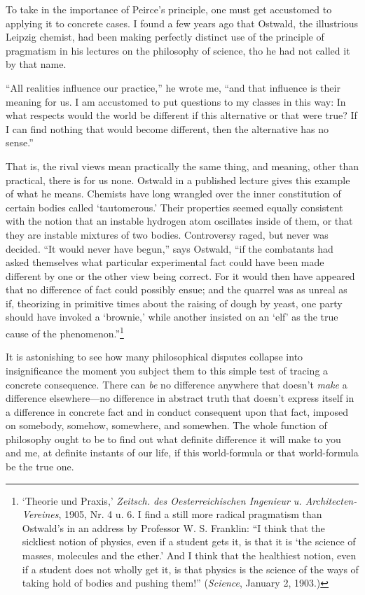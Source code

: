 To take in the importance of Peirce's principle, one must get
accustomed to applying it to concrete cases. I found a few years ago
that Ostwald, the illustrious Leipzig chemist, had been making
perfectly distinct use of the principle of pragmatism in his lectures
on the philosophy of science, tho he had not called it by that name.

``All realities influence our practice,'' he wrote me, ``and that
influence is their meaning for us. I am accustomed to put questions to
my classes in this way: In what respects would the world be different
if this alternative or that were true? If I can find nothing that
would become different, then the alternative has no sense.''

That is, the rival views mean practically the same thing, and meaning,
other than practical, there is for us none. Ostwald in a published
lecture gives this example of what he means. Chemists have long
wrangled over the inner constitution of certain bodies called
`tautomerous.' Their properties seemed equally consistent with the
notion that an instable hydrogen  atom oscillates inside of
them, or that they are instable mixtures of two bodies. Controversy
raged, but never was decided. ``It would never have begun,'' says
Ostwald, ``if the combatants had asked themselves what particular
experimental fact could have been made different by one or the other
view being correct. For it would then have appeared that no difference
of fact could possibly ensue; and the quarrel was as unreal as if,
theorizing in primitive times about the raising of dough by yeast, one
party should have invoked a `brownie,' while another insisted on an
`elf' as the true cause of the phenomenon.''\footnote{`Theorie und
Praxis,' \textit{Zeitsch. des Oesterreichischen Ingenieur u.
Architecten-Vereines}, 1905, Nr. 4 u. 6. I find a still more radical
pragmatism than Ostwald's in an address by Professor W. S. Franklin:
``I think that the sickliest notion of physics, even if a student gets
it, is that it is `the science of masses, molecules and the ether.'
And I think that the healthiest notion, even if a student does not
wholly get it, is that physics is the science of the ways of taking
hold of bodies and pushing them!'' (\textit{Science}, January 2,
1903.)}

It is astonishing to see how many philosophical disputes collapse into
insignificance the moment you subject them to this simple test of
tracing a concrete consequence. There can \textit{be}  no
difference anywhere that doesn't \textit{make} a difference
else\-where---no difference in abstract truth that doesn't express
itself in a difference in concrete fact and in conduct consequent upon
that fact, imposed on somebody, somehow, somewhere, and somewhen. The
whole function of philosophy ought to be to find out what definite
difference it will make to you and me, at definite instants of our
life, if this world-formula or that world-formula be the true one.

